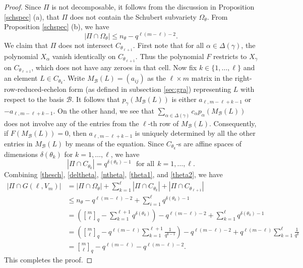 \documentclass[10pt,a4paper,oneside]{amsproc}
\newcommand{\B}{\mathcal{B}}
\def\a{{\alpha}}
\begin{document}
\begin{proof}
    Since $\Pi$ is not decomposable, it follows from the discussion in Proposition \ref{schspec} (a), that $\Pi$ does not contain the Schubert subvariety $\Omega_\theta$. From Proposition \ref{schspec} (b), we have 
    \begin{equation}\label{theta1}
    |\Pi \cap \Omega_\theta| \le n_\theta - q^{\ell (m-\ell) - 2}. 
    \end{equation}
    We claim  that $\Pi$ does not intersect $C_{\theta_{\ell+1}}$. First note that for all $\a \in \Delta (\gamma)$, the polynomial $X_\a$ vanish identically on $C_{\theta_{\ell + 1}}$. Thus the polynomial $F$ restricts to $X_\gamma$ on $C_{\theta_{\ell + 1}}$, which does not have any zeroes in that cell. Now fix $k \in \{1, \dots, \ell\}$ and an element $L \in C_{\theta_k}$. Write $M_\B (L) = (a_{ij})$ as the $\ell \times m$ matrix in the right-row-reduced-echelon form (as defined in subsection \ref{sec:gra}) representing $L$ with respect to the basis $\B.$ It follows that 
    $p_\gamma (M_\B (L))$ is either $a_{\ell, m-\ell + k - 1}$ or $-a_{\ell, m-\ell + k - 1}$. On the other hand, we see that  $\sum_{\a \in \Delta (\gamma)} c_\a p_\a (M_\B (L))$ does not involve any of the entries from the $\ell$-th row of $M_\B (L)$. Consequently, if $F( M_\B (L)) = 0$, then $a_{\ell, m-\ell + k - 1}$ is uniquely determined by all the other entries in $M_{\B} (L)$ by means of the equation. Since $C_{\theta_k}$-s are affine spaces of dimensions $\delta (\theta_k)$ for $k = 1, \dots, \ell$, we have
    \begin{equation}\label{theta2}
    |\Pi \cap C_{\theta_k}| = q^{\delta (\theta_k) - 1} \ \ \ \text{for all} \ \ k = 1, \dots, \ell.
    \end{equation}
    Combining \eqref{thesch}, \eqref{deltheta}, \eqref{ntheta}, \eqref{theta1}, and \eqref{theta2}, we have
    \begin{align*}
    |\Pi \cap G(\ell, V_m)| &= |\Pi \cap \Omega_\theta| + \sum_{k=1}^\ell |\Pi \cap C_{\theta_k}|  + |\Pi \cap C_{\theta_{\ell+1}}| \\
    &\le n_\theta - q^{\ell (m-\ell) - 2} + \sum_{i=1}^\ell q^{\delta (\theta_k) - 1} \\
    &= \left({m \brack \ell}_q - \sum_{k=1}^{\ell + 1} q^{\delta (\theta_k)} \right) - q^{\ell (m-\ell) - 2} + \sum_{k=1}^{\ell} q^{\delta (\theta_k) - 1} \\
    &= \left({m \brack \ell}_q - q^{\ell(m-\ell)} \sum_{k=1}^{\ell + 1} \frac{1}{q^{k-1}}\right) - q^{\ell (m-\ell) - 2} + q^{\ell(m-\ell)} \sum_{k=1}^{\ell} \frac{1}{q^{k}} \\
    &= {m \brack \ell}_q - q^{\ell (m - \ell)} - q^{\ell  (m - \ell) - 2}.
   \end{align*}
   This completes the proof.
    \end{proof}
\end{document}
